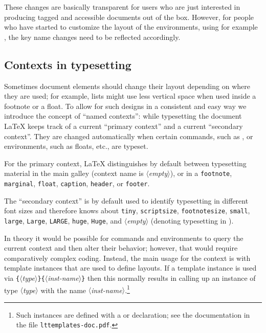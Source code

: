 \documentclass{ltnews}
\providecommand\meta[1]{$\langle$\textrm{\itshape#1}$\rangle$}
\providecommand\Arg[1]{\texttt\{\meta{#1}\texttt\}}
\begin{document}
These changes are basically transparent for users who are just
interested in producing tagged and accessible documents out of the
box. However, for people who have started to customize the layout of the 
environments, using for example , the key
name changes need to be reflected accordingly.


\subsection{Contexts in typesetting}

Sometimes document elements should change their layout depending on
where they are used; for example, lists might use less vertical space
when used inside a footnote or a float. To allow for such designs in a
consistent and easy way we introduce the concept of \enquote{named
  contexts}: while typesetting the document \LaTeX{} keeps track of a
current \enquote{primary context} and a current \enquote{secondary
  context}. They are changed automatically when certain commands, such
as , or environments, such as floats, etc., are typeset.

For the primary context, \LaTeX{} distinguishes by default between
typesetting material in the main galley (context name is
\meta{empty}), or in a \texttt{footnote}, \texttt{marginal},
\texttt{float}, \texttt{caption}, \texttt{header}, or \texttt{footer}.

The \enquote{secondary context} is by default used to identify
typesetting in different font sizes and therefore knows about
\texttt{tiny}, \texttt{scriptsize}, \texttt{footnotesize},
\texttt{small}, \texttt{large}, \texttt{Large}, \texttt{LARGE},
\texttt{huge}, \texttt{Huge}, and \meta{empty} (denoting typesetting
in ).

In theory it would be possible for commands and environments to query
the current context and then alter their behavior; however, that would
require comparatively complex coding. Instead, the main usage for the
context is with template instances that are used to define layouts.
If a template instance is used via
\Arg{type}\Arg{inst-name} then this normally results
in calling up an instance of type \meta{type} with the name
\meta{inst-name}.\footnote{Such instances are defined with a
 or  declaration; see the
documentation in the file \texttt{lttemplates-doc.pdf}.}
\end{document}
